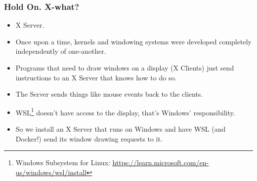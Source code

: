     \begin{frame}
      \frametitle{Hold On. X-what?}
      \begin{itemize}
      \item<2->X Server.
      \item<3->Once upon a time, kernels and windowing systems were developed
        completely independently of one-another.
      \item<4->Programs that need to draw windows on a display (X Clients)
        just send instructions to an X Server that knows how to do so.
      \item<5->The Server sends things like mouse events back to the clients.
      \item<6->WSL\footnote<6->{Windows Subsystem for Linux: \href{https://learn.microsoft.com/en-us/windows/wsl/install}{https://learn.microsoft.com/en-us/windows/wsl/install}} doesn't have access to the display, that's Windows'
        responsibility.
      \item<7->So we install an X Server that runs on Windows and have WSL (and
        Docker!) send its window drawing requests to it.
      \end{itemize}
    \end{frame}

